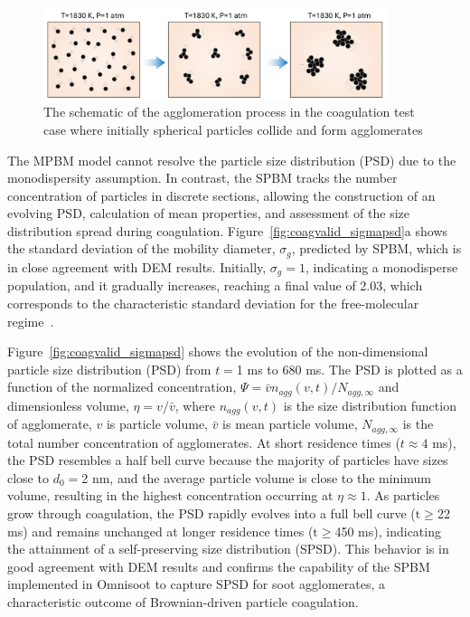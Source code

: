 \begin{figure}[H]
	\centering
	\includegraphics[width=0.9\textwidth]{Figures/Results/Validation/Coagulation/coagulation_scheme.pdf}
	\caption{The schematic of the agglomeration process in the coagulation test case where initially spherical particles collide and form agglomerates}
	\label{fig:coagscheme}
\end{figure}

The MPBM model cannot resolve the particle size distribution (PSD) due to the monodispersity assumption. In contrast, the SPBM tracks the number concentration of particles in discrete sections, allowing the construction of an evolving PSD, calculation of mean properties, and assessment of the size distribution spread during coagulation. Figure~\ref{fig:coagvalid_sigmapsd}a shows the standard deviation of the mobility diameter, ${\sigma_g}$, predicted by SPBM, which is in close agreement with DEM results. Initially, ${\sigma_g}=1$, indicating a monodisperse population, and it gradually increases, reaching a final value of 2.03, which corresponds to the characteristic standard deviation for the free-molecular regime~\citep{vemury1995self}.

Figure~\ref{fig:coagvalid_sigmapsd} shows the evolution of the non-dimensional particle size distribution (PSD) from $t=$1 ms to 680 ms. The PSD is plotted as a function of the normalized concentration, ${\Psi= \bar{v}n_{agg}(v,t)/N_{agg,\infty}}$ and dimensionless volume, ${\eta= v/ \bar{v}}$, where ${n_{agg}(v,t)}$ is the size distribution function of agglomerate, ${v}$ is particle volume, ${\bar{v}}$ is mean particle volume, ${N_{agg,\infty}}$ is the total number concentration of agglomerates. At short residence times ($t\approx4$ ms), the PSD resembles a half bell curve because the majority of particles have sizes close to ${d_0=}$2 nm, and the average particle volume is close to the minimum volume, resulting in the highest concentration occurring at ${\eta\approx1}$. As particles grow through coagulation, the PSD rapidly evolves into a full bell curve ($\mathrm{t\ge}$22 ms) and remains unchanged at longer residence times ($\mathrm{t\ge}$450 ms), indicating the attainment of a self-preserving size distribution (SPSD). This behavior is in good agreement with DEM results and confirms the capability of the SPBM implemented in Omnisoot to capture SPSD for soot agglomerates, a characteristic outcome of Brownian-driven particle coagulation.

